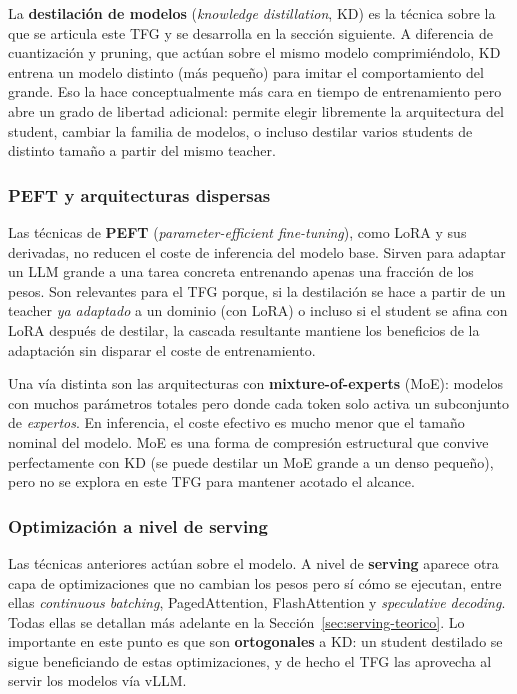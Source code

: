\documentclass[11pt,a4paper]{article}
\begin{document}
La \textbf{destilación de modelos} (\textit{knowledge distillation}, KD) es la técnica sobre la que se articula este TFG y se desarrolla en la sección siguiente. A diferencia de cuantización y pruning, que actúan sobre el mismo modelo comprimiéndolo, KD entrena un modelo distinto (más pequeño) para imitar el comportamiento del grande. Eso la hace conceptualmente más cara en tiempo de entrenamiento pero abre un grado de libertad adicional: permite elegir libremente la arquitectura del student, cambiar la familia de modelos, o incluso destilar varios students de distinto tamaño a partir del mismo teacher.

\subsubsection{PEFT y arquitecturas dispersas}

Las técnicas de \textbf{PEFT} (\textit{parameter-efficient fine-tuning}), como LoRA y sus derivadas, no reducen el coste de inferencia del modelo base. Sirven para adaptar un LLM grande a una tarea concreta entrenando apenas una fracción de los pesos. Son relevantes para el TFG porque, si la destilación se hace a partir de un teacher \textit{ya adaptado} a un dominio (con LoRA) o incluso si el student se afina con LoRA después de destilar, la cascada resultante mantiene los beneficios de la adaptación sin disparar el coste de entrenamiento.

Una vía distinta son las arquitecturas con \textbf{mixture-of-experts} (MoE): modelos con muchos parámetros totales pero donde cada token solo activa un subconjunto de \textit{expertos}. En inferencia, el coste efectivo es mucho menor que el tamaño nominal del modelo. MoE es una forma de compresión estructural que convive perfectamente con KD (se puede destilar un MoE grande a un denso pequeño), pero no se explora en este TFG para mantener acotado el alcance.

\subsubsection{Optimización a nivel de serving}

Las técnicas anteriores actúan sobre el modelo. A nivel de \textbf{serving} aparece otra capa de optimizaciones que no cambian los pesos pero sí cómo se ejecutan, entre ellas \textit{continuous batching}, PagedAttention, FlashAttention y \textit{speculative decoding}. Todas ellas se detallan más adelante en la Sección~\ref{sec:serving-teorico}. Lo importante en este punto es que son \textbf{ortogonales} a KD: un student destilado se sigue beneficiando de estas optimizaciones, y de hecho el TFG las aprovecha al servir los modelos vía vLLM.
\end{document}
